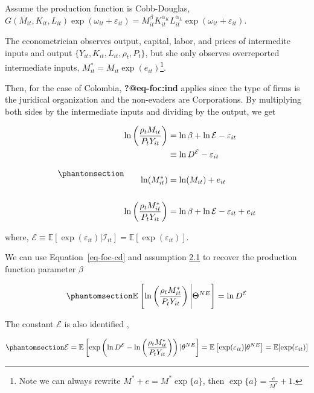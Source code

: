 \documentclass[
  12pt]{article}
\theoremstyle{definition}
\theoremstyle{remark}
\begin{document}
Assume the production function is Cobb-Douglas,
\(G(M_{it}, K_{it}, L_{it})\exp(\omega_{it}+\varepsilon_{it})=M^{\beta}_{it}K_{it}^{\alpha_K}L_{it}^{\alpha_L}\exp(\omega_{it}+\varepsilon_{it})\).

The econometrician observes output, capital, labor, and prices of
intermedite inputs and output \(\{Y_{it},K_{it},L_{it},\rho_t, P_t\}\),
but she only observes overreported intermediate inputs,
\(M^*_{it}=M_{it}\exp(e_{it})\)\footnote{Note we can always rewrite
  \(M^*+e=M^*\exp\{a\}\), then \(\exp\{a\}=\frac{e}{M^*}+1\).}.

Then, for the case of Colombia, \textbf{?@eq-foc:ind} applies since the
type of firms is the juridical organization and the non-evaders are
Corporations. By multiplying both sides by the intermediate inputs and
dividing by the output, we get

\begin{equation}\phantomsection\label{eq-foc-cd}{
\begin{aligned}
    \ln\left(\frac{\rho_t M_{it}}{P_{t}Y_{it}}\right) &=\ln\beta + \ln \mathcal{E}- \varepsilon_{it} \\
    &\equiv \ln D^{\mathcal{E}}- \varepsilon_{it} \\
    &\\
    \ln(M^*_{it})&=\ln(M_{it})+e_{it} \\ 
    &\\
    \ln\left(\frac{\rho_t M^*_{it}}{P_{t}Y_{it}}\right) &=\ln\beta + \ln \mathcal{E}- \varepsilon_{it}+e_{it} \\
\end{aligned}
}\end{equation}

where,
\(\mathcal{E}\equiv \mathbb{E}[\exp(\varepsilon_{it})|\mathcal{I}_{it}]=\mathbb{E}[\exp(\varepsilon_{it})]\).

We can use Equation~\ref{eq-foc-cd} and assumption
\hyperref[ass-non-ev]{2.1} to recover the production function parameter
\(\beta\)

\begin{equation}\phantomsection\label{eq-foc-cd-exp}{
    \mathbb{E}\left[\ln\left(\frac{\rho_t M^*_{it}}{P_{t}Y_{it}}\right)\Bigg| \Theta^{NE}\right]=\ln D^{\mathcal{E}}
}\end{equation}

The constant \(\mathcal{E}\) is also identified \citep{Gandhi2020},

\begin{equation}\phantomsection\label{eq-id-E}{
\mathcal{E}=\mathbb{E}\left[\exp\left(\ln D^{\mathcal{E}}- \ln\left(\frac{\rho_t M^*_{it}}{P_{t}Y_{it}}\right)\right)|\theta^{NE}\right]=\mathbb{E}\left[\exp(\varepsilon_{it})|\theta^{NE}\right]=\mathbb{E}[\exp(\varepsilon_{it})]
}\end{equation}
\end{document}
